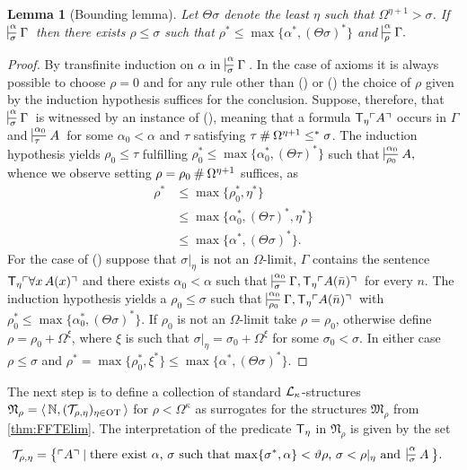 \documentclass[UKenglish,cleveref,DIV=12]{scrartcl}
\newtheorem{lemma}{Lemma}[section]
\theoremstyle{definition}
\theoremstyle{definition}
\newcommand{\gelhighlight}[1]{\highlight[magenta]{#1}}
\begin{document}
\begin{lemma}[Bounding lemma]\label{lem:T8conden}
	Let $\Theta\sigma$ denote the least $\eta$ such that $\Omega^{\eta+1}>\sigma$. 
	If\/ $\prov\alpha\sigma\Gamma$ then there exists $\rho\le\sigma$ such that
	$\rho^*\le\max\{\alpha^*, (\Theta \sigma)^* \}$ and $\prov\alpha\rho{\Gamma.}$\gelhighlight{We don't use this any more??}
\end{lemma}
\begin{proof}
By transfinite induction on \( \alpha \) in $\prov\alpha\sigma\Gamma$. 
In the case of axioms it is always possible to choose $\rho=0$ and for any rule other than (\Uni\eta) or (\Nec\eta) the choice of $\rho$ given by the induction hypothesis suffices for the conclusion. 
Suppose, therefore, that $\prov\alpha\sigma\Gamma$ is witnessed by an instance of (\Nec\eta), meaning that a formula $\mathsf{T}_\eta \ulcorner{A}\urcorner$ occurs in $\Gamma$ and $\prov{\alpha_0}\tau A$ for some $\alpha_0<\alpha$ and \( \tau \) satisfying  $\tau\mathbin{\#}\Omega^{\eta+1}\le^*\sigma$. 
The induction hypothesis yields $\rho_0\le\tau$ fulfilling $\rho_0^*\le\max\{\alpha_0^*,(\Theta \tau)^* \}$ such that
$\prov{\alpha_0}{\rho_0}{A,}$ whence we observe setting $\rho=\rho_0\mathbin{\#}\Omega^{\eta+1}$
suffices, as
\begin{align*}
  \rho^*&\le\max\{\rho_0^*,\eta^*\}\\
	&\le\max\{\alpha_0^*,(\Theta \tau)^*,\eta^*\}\\
	&\le\max\{\alpha^*, (\Theta \sigma)^* \}.
\end{align*}
For the case of (\Uni\eta) suppose that $\sigma|_\eta$ is not an $\Omega$-limit, $\Gamma$ contains the sentence
$\mathsf{T}_\eta \ulcorner{\forall x\,A(x)}\urcorner$ and there exists $\alpha_0<\alpha$ such that
$\prov{\alpha_0}\sigma{\Gamma,\T_\eta \gn{A(\bar n)} }$ for every $n$. 
The induction hypothesis yields a $\rho_0\le\sigma$ such that $\prov{\alpha_0}{\rho_0}{\Gamma,\T_\eta \gn{A(\bar n)} }$ with $\rho_0^* \le \max\{\alpha_0^*, (\Theta \sigma)^* \}$. 
If $\rho_0$ is not an $\Omega$-limit take $\rho=\rho_0$, otherwise define
$\rho=\rho_0+\Omega^\xi$, where $\xi$ is such that $\sigma|_\eta=\sigma_0+\Omega^{\xi}$ for some $\sigma_0<\sigma$.
In either case $\rho\le\sigma$ and
\( \rho^*=\max\{\rho_0^*,\xi^*\}\le\max\{\alpha^*, ( \Theta \sigma)^*\}\). 
\end{proof}

The next step is to define a collection of standard $\mathcal{L}_\kappa$-structures $\mathfrak N_\rho = \langle\, \mathbb N , ( \mathcal{T}_{\rho,\eta} )_{\eta \in \mathrm{OT} }\,\rangle $ for $\rho<\Omega^\kappa$ as surrogates for the structures $\mathfrak{M}_\rho$ from \cref{thm:FFTElim}. 
The interpretation of the predicate \( \mathsf{T}_\eta \) in \( \mathfrak N_\rho \) is given by the set
\begin{align*}
	\FF_{\rho,\eta} = \bigl\{ \gn A &\mid \text{there exist $\alpha$, $\sigma$ such that $\max\{ \sigma^*,\alpha \} <\vartheta\rho$, $\sigma<\rho|_\eta$ and\,  $\prov{\alpha}{\sigma}A$} \bigr\}.
\end{align*}
\end{document}
